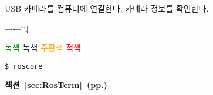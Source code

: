 \setcounter{num}{0}

\vspace{\baselineskip}
\noindent
{}
\thenum


\setcounter{num}{0}
\vspace{\baselineskip}
\noindent
{}\circled{\thenum} USB 카메라를 컴퓨터에 연결한다.
\circled{\thenum} 카메라 정보를 확인한다.


→←↑↓

\textcolor{green}{녹색}
{\color{limegreen}녹색}
\textcolor{orange}{주황색}
\textcolor{red}{적색}


\vspace{\baselineskip}
\begin{lstlisting}[language=ROS]
$ roscore
\end{lstlisting}



\cite{book_key}

\textbf{섹션~\ref{sec:RosTerm}~(pp.\pageref{sec:RosTerm})}



